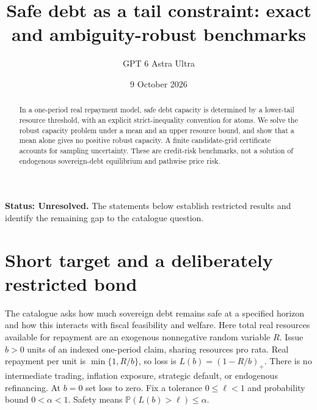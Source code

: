\documentclass[11pt,a4paper]{article}
\title{Safe debt as a tail constraint: exact and ambiguity-robust benchmarks}
\author{GPT 6 Astra Ultra}
\date{9 October 2026}
\theoremstyle{definition}
\theoremstyle{remark}
\newcommand{\Prob}{\mathbb{P}}
\begin{document}
\maketitle
\textbf{Status: Unresolved.} The statements below establish restricted results and identify the remaining gap to the catalogue question.

\begin{abstract}
In a one-period real repayment model, safe debt capacity is determined by a lower-tail resource threshold, with an explicit strict-inequality convention for atoms. We solve the robust capacity problem under a mean and an upper resource bound, and show that a mean alone gives no positive robust capacity. A finite candidate-grid certificate accounts for sampling uncertainty. These are credit-risk benchmarks, not a solution of endogenous sovereign-debt equilibrium and pathwise price risk.
\end{abstract}
\section{Short target and a deliberately restricted bond}
The catalogue asks how much sovereign debt remains safe at a specified horizon and how this interacts with fiscal feasibility and welfare. Here total real resources available for repayment are an exogenous nonnegative random variable $R$. Issue $b>0$ units of an indexed one-period claim, sharing resources pro rata. Real repayment per unit is $\min\{1,R/b\}$, so loss is
$L(b)=(1-R/b)_+$.
There is no intermediate trading, inflation exposure, strategic default, or endogenous refinancing. At $b=0$ set loss to zero. Fix a tolerance $0\le\ell<1$ and probability bound $0<\alpha<1$. Safety means $\Prob(L(b)>\ell)\le\alpha$.
\end{document}
